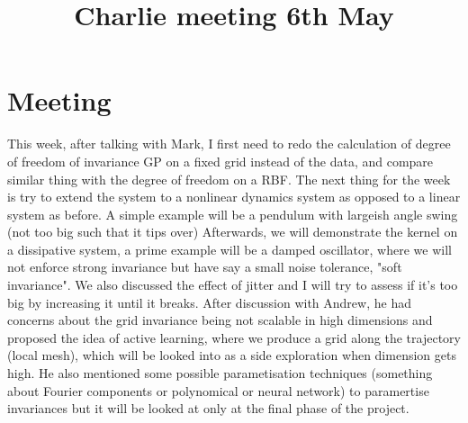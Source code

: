 \documentclass{article}
\title{\vspace{-3cm}Charlie meeting 6th May\vspace{-3em}}
\author{}
\date{}
\begin{document}
\maketitle
\section*{Meeting}
This week, after talking with Mark, I first need to redo the calculation of degree of freedom of invariance GP on a fixed grid instead of the data, and compare similar thing with the degree of freedom on a RBF.
The next thing for the week is try to extend the system to a nonlinear dynamics system as opposed to a linear system as before.
A simple example will be a pendulum with largeish angle swing (not too big such that it tips over)
Afterwards, we will demonstrate the kernel on a dissipative system, a prime example will be a damped oscillator, where we will not enforce strong invariance but have say a small noise tolerance, "soft invariance". 
We also discussed the effect of jitter and I will try to assess if it's too big by increasing it until it breaks.
After discussion with Andrew, he had concerns about the grid invariance being not scalable in high dimensions and proposed the idea of active learning, where we produce a grid along the trajectory (local mesh), which will be looked into as a side exploration when dimension gets high.
He also mentioned some possible parametisation techniques (something about Fourier components or polynomical or neural network) to paramertise invariances but it will be looked at only at the final phase of the project.
\end{document}

